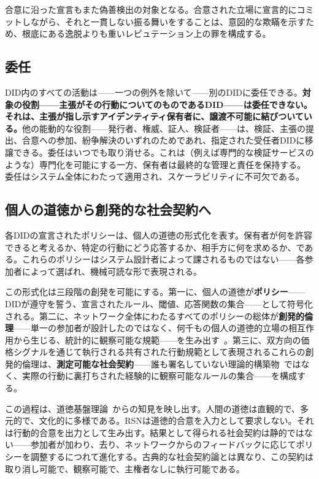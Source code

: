 \documentclass[11pt,a4paper,twocolumn]{article}
\begin{document}
合意に沿った宣言もまた偽善検出の対象となる。合意された立場に宣言的にコミットしながら、それと一貫しない振る舞いをすることは、意図的な欺瞞を示すため、根底にある逸脱よりも重いレピュテーション上の罪を構成する。

\subsection{委任}

DID内のすべての活動は——一つの例外を除いて——別のDIDに委任できる。\textbf{対象の役割——主張がその行動についてのものであるDID——は委任できない。それは、主張が指し示すアイデンティティ保有者に、譲渡不可能に結びついている。}他の能動的な役割——発行者、権威、証人、検証者——は、検証、主張の提出、合意への参加、紛争解決のいずれのためであれ、指定された受任者DIDに移譲できる。委任はいつでも取り消せる。これは（例えば専門的な検証サービスのような）専門化を可能にする一方、保有者は最終的な管理と責任を保持する。委任はシステム全体にわたって適用され、スケーラビリティに不可欠である。

\subsection{個人の道徳から創発的な社会契約へ}

各DIDの宣言されたポリシーは、個人の道徳の形式化を表す。保有者が何を許容できると考えるか、特定の行動にどう応答するか、相手方に何を求めるか、である。これらのポリシーはシステム設計者によって課されるものではない——各参加者によって選ばれ、機械可読な形で表現される。

この形式化は三段階の創発を可能にする。第一に、個人の道徳が\textbf{ポリシー}——DIDが遵守を誓う、宣言されたルール、閾値、応答関数の集合——として符号化される。第二に、ネットワーク全体にわたるすべてのポリシーの総体が\textbf{創発的倫理}——単一の参加者が設計したのではなく、何千もの個人の道徳的立場の相互作用から生じる、統計的に観察可能な規範——を生み出す~\cite{durkheim1893}。第三に、双方向の価格シグナルを通じて執行される共有された行動規範として表現されるこれらの創発的倫理は、\textbf{測定可能な社会契約}——誰も署名していない理論的構築物~\cite{rawls1971}ではなく、実際の行動に裏打ちされた経験的に観察可能なルールの集合——を構成する。

この過程は、道徳基盤理論~\cite{haidt2012}からの知見を映し出す。人間の道徳は直観的で、多元的で、文化的に多様である。RSNは道徳的合意を入力として要求しない。それは行動的合意を出力として生み出す。結果として得られる社会契約は静的ではない——参加者が加わり、去り、ネットワークからのフィードバックに応じてポリシーを調整するにつれて進化する。古典的な社会契約論とは異なり、この契約は取り消し可能で、観察可能で、主権者なしに執行可能である。
\end{document}
